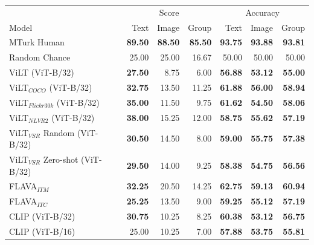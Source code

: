 \begin{table}[ht]
\centering
\begin{adjustbox}{max width=0.6\textwidth}
\begin{tabular}{l|rrr|rrr}
\toprule
 &
  \multicolumn{3}{c|}{{Score}} &
  \multicolumn{3}{c}{{Accuracy}} \\
 Model                               & Text           & Image          & Group          & Text       & Image      & Group      \\
\midrule
 MTurk Human                         & \textbf{89.50} & \textbf{88.50} & \textbf{85.50} & \textbf{93.75} & \textbf{93.88} & \textbf{93.81} \\
 Random Chance                       & 25.00          & 25.00          & 16.67          & 50.00          & 50.00          & 50.00          \\
 \midrule
 ViLT (ViT-B/32)                     & \textbf{27.50} & 8.75           & 6.00           & \textbf{56.88} & \textbf{53.12} & \textbf{55.00} \\
 ViLT$_{COCO}$ (ViT-B/32)            & \textbf{32.75} & 13.50          & 11.25          & \textbf{61.88} & \textbf{56.00} & \textbf{58.94} \\
 ViLT$_{Flickr30k}$ (ViT-B/32)       & \textbf{35.00} & 11.50          & 9.75           & \textbf{61.62} & \textbf{54.50} & \textbf{58.06} \\
 ViLT$_{NLVR2}$ (ViT-B/32)           & \textbf{38.00} & 15.25          & 12.00          & \textbf{58.75} & \textbf{55.62} & \textbf{57.19} \\
 ViLT$_{VSR}$ Random (ViT-B/32)      & \textbf{30.50} & 14.50          & 8.00           & \textbf{59.00} & \textbf{55.75} & \textbf{57.38} \\
 ViLT$_{VSR}$ Zero-shot (ViT-B/32)   & \textbf{29.50} & 14.00          & 9.25           & \textbf{58.38} & \textbf{54.75} & \textbf{56.56} \\
 FLAVA$_{ITM}$                       & \textbf{32.25} & 20.50          & 14.25          & \textbf{62.75} & \textbf{59.13} & \textbf{60.94} \\
 FLAVA$_{ITC}$                       & \textbf{25.25} & 13.50          & 9.00           & \textbf{59.25} & \textbf{55.12} & \textbf{57.19} \\
 CLIP (ViT-B/32)                     & \textbf{30.75} & 10.25          & 8.25           & \textbf{60.38} & \textbf{53.12} & \textbf{56.75} \\
 CLIP (ViT-B/16)                     & 25.00          & 10.25          & 7.00           & \textbf{57.88} & \textbf{53.75} & \textbf{55.81} \\

\end{tabular}
\end{adjustbox}
\end{table}
